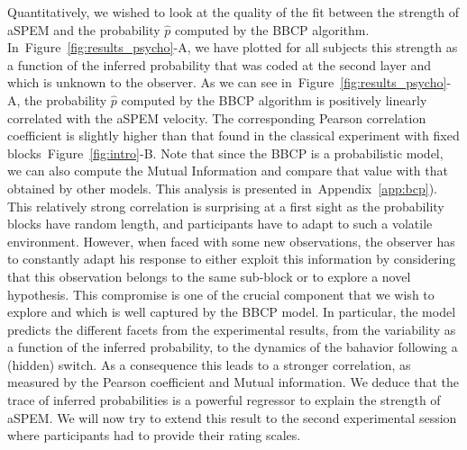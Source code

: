 \documentclass[12pt,english]{article}%
\newcommand{\seeFig}[1]{Figure~\ref{fig:#1}}
\newcommand{\seeApp}[1]{Appendix~\ref{app:#1}}
\begin{document}
Quantitatively, we wished to look at the quality of the fit
between the strength of aSPEM and
the probability $\hat{p}$ computed by the BBCP algorithm.
In~\seeFig{results_psycho}-A, we have plotted for all subjects
this strength as a function of the inferred probability
that was coded at the second layer and which is unknown to the observer.
As we can see in~\seeFig{results_psycho}-A,
the probability $\hat{p}$ computed by the BBCP algorithm
is positively linearly correlated with the aSPEM velocity.
The corresponding Pearson correlation coefficient
is slightly higher than that found in
the classical experiment with fixed blocks~\seeFig{intro}-B.
Note that since the BBCP is a probabilistic model,
we can also compute the Mutual Information and
compare that value with that obtained by other models.
This analysis is presented in~\seeApp{bcp}).
This relatively strong correlation is surprising at a first sight as the probability blocks have random length,
and participants have to adapt to such a volatile environment.
However, when faced with some new observations,
the observer has to constantly adapt his response
to either exploit this information by considering that
this observation belongs to the same sub-block or to explore
a novel hypothesis.
This compromise is one of the crucial component that we wish to explore
and which is well captured by the BBCP model.
In particular, the model predicts the different facets
from the experimental results,
from the variability as a function of the inferred probability,
to the dynamics of the bahavior following a (hidden) switch.
As a consequence this leads to a stronger correlation,
as measured by the Pearson coefficient and Mutual information.
We deduce that the trace of inferred probabilities is a powerful regressor
to explain the strength of aSPEM.
We will now try to extend this result
to the second experimental session
where participants had to provide their rating scales.
\end{document}
